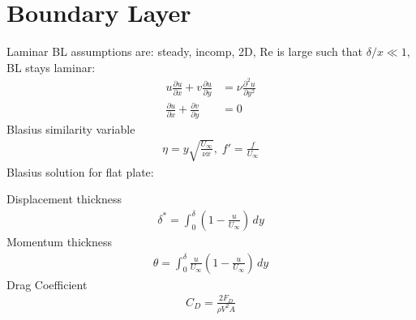\section{Boundary Layer}
Laminar BL assumptions are: steady, incomp, 2D, Re is large such that $\delta/x \ll 1$, BL stays laminar:
\begin{align*}
    u \frac{\partial u}{\partial x} + v \frac{\partial u}{\partial y} &= \nu \frac{\partial^2 u}{\partial y^2} \\
    \frac{\partial u}{\partial x} + \frac{\partial v}{\partial y} &= 0
\end{align*}
Blasius similarity variable
\begin{align*}
    \eta = y \sqrt{\frac{U_\infty}{\nu x}}, \; f' = \frac{f}{U_\infty}
\end{align*}
Blasius solution for flat plate:
\vspace{-10pt}
\begin{table}[H]
    \centering
    \footnotesize
     \vspace{-20pt}
\end{table}
Displacement thickness
\begin{align*}
    \delta^* = \int_0^\delta (1 - \frac{u}{U_\infty}) \, dy
\end{align*}
Momentum thickness
\begin{align*}
    \theta = \int_0^\delta \frac{u}{U_\infty} (1 - \frac{u}{U_\infty}) \, dy
\end{align*}
Drag Coefficient
\begin{align*}
    C_D = \frac{2 F_D}{\rho V^2 A}
\end{align*}
